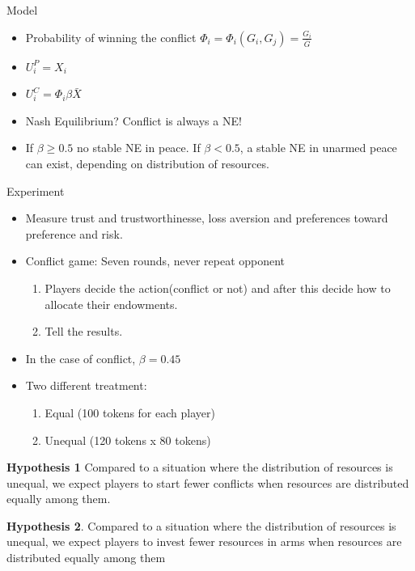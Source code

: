 \documentclass[11pt]{beamer}
\begin{document}
\begin{frame}{Model}

\begin{itemize}
\item Probability of winning the conflict $\Phi_{i} = \Phi_{i}(G_{i},G_{j}) = \frac{G_{i}}{\bar{G}}$

\item $U^{P}_{i} = X_{i}$

\item $U^{C}_{i} = \Phi_{i} \beta \bar{X}$

\item Nash Equilibrium? Conflict is always a NE!

\item If $\beta \geq 0.5$ no stable NE in peace. If $\beta <0.5$, a stable NE in unarmed peace can exist, depending on distribution of resources.
\end{itemize}
\end{frame}

\begin{frame}{Experiment}
\begin{itemize}
\item Measure trust and trustworthinesse, loss aversion and preferences toward preference and risk.

\item Conflict game: Seven rounds, never repeat opponent
\begin{enumerate}
\item Players decide the action(conflict or not) and after this decide how to allocate their endowments.
\item Tell the results.
\end{enumerate}

\item In the case of conflict, $\beta = 0.45$

\item Two different treatment: 

\begin{enumerate} 
\item Equal (100 tokens for each player) 
\item Unequal (120 tokens x 80 tokens)

\end{enumerate}
\end{itemize}
\end{frame}

\begin{frame}
\textbf{Hypothesis 1} Compared to a situation where the distribution of resources is unequal, we expect players to start fewer conflicts when
resources are distributed equally among them.


\textbf{Hypothesis 2}. Compared to a situation where the distribution of resources is unequal, we expect players to invest fewer resources in
arms when resources are distributed equally among them
\end{frame}
\end{document}
